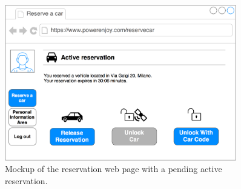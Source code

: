 \begin{figure}[H]
\begin{center}
		\includegraphics[width=0.9\textwidth]{./specific_requirements/features/diagrams/web_recap_reserv.png}
		\caption{Mockup of the reservation web page with a pending active reservation.}
		\label{web_recap_reserv}
\end{center}
\end{figure}